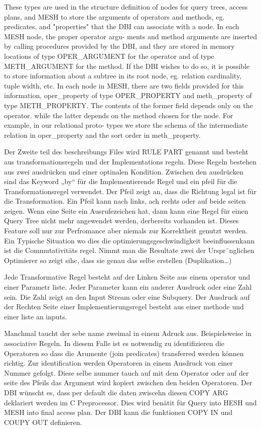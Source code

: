 These types are used in the structure definition of nodes for query trees, access plans, and MESH to store the arguments of operators and methods, eg. predicates, and "properties" that the DBI can associate with a node. In each MESH node, the proper operator argu- ments and method arguments are inserted by calling procedures provided by the DBI, and they are stored in memory locations of type OPER_ARGUMENT for the operator and of type METH_ARGUMENT for the method. If the DBI wishes to do so, it is possible to store information about a subtree in its root node, eg. relation cardinality, tuple width, etc. In each node in MESH, there are two fields provided for this information, oper_property of type OPER_PROPERTY and meth_property of type METH_PROPERTY. The contents of the former field depends only on the operator. while the latter depends on the method chosen for the node. For example, in our relational proto- types we store the schema of the intermediate relation in oper_property and the sort order in meth_property.

Der Zweite teil des beschreibungs Files wird RULE PART genannt und besteht aus transformationsregeln und der Implementations regeln. Diese Regeln bestehen aus zwei ausdrücken und einer optinalen Kondition. Zwischen den ausdrücken sind das Keyword „by“ für die Implementierende Regel und ein pfeil für die Transformationsregel verwendet. Der Pfeil zeigt an, dass die Richtung legal ist für die Transformation. Ein Pfeil kann nach links, ach rechts oder auf beide seiten zeigen. Wenn eine Seite ein Ausrufezeichen hat, dann kann eine Regel für einen Query Tree nicht mehr angewendet werden, derbereits vorhanden ist. Dieses Feature soll nur zur Perfromance aber niemals zur Korrektheit genutzt werden. Ein Typische Situation wo dies die optimierungsgeschwindigkeit beeinflussenkann ist die Commutativitäts regel. Nimmt man die Resultate zwei der Urspr¨nglichen Optimierer so zeigt sihc, dass sie genau das selbe erstellen (Duplikation…)

Jede Transformative Regel besteht auf der Linken Seite aus einem operator und einer Parametr liste. Jeder Parameter kann ein anderer Ausdruck oder eine Zahl sein. Die Zahl zeigt an den Input Stream oder eine Subquery. Der Ausdruck auf der Rechten Seite einer Implementierungsregel besteht aus einer methode und einer liste an inputs.

Manchmal taucht der sebe name zweimal in einem Adruck aus. Beispielsweise in associative Regeln. In diesem Falle ist es notwendig zu identifizieren die Operatoren so dass die Arumente (join predicates) transferred werden können richtig. Zur identification werden Operatoren in einem Ausdruck von einer Nummer gefolgt. Diese selbe nummer tauch auf mit dem Operator oder auf der seite des Pfeils das Argument wird kopiert zwischen den beiden Operatoren. Der DBI wünscht es, dass per default die daten zwiscehn diesen COPY ARG deklariert werden im C Preprocessor. Dies wird benätit für Query into HESH und MESH into final access plan. Der DBI kann die funktionen COPY IN und COUPY OUT definieren.  


